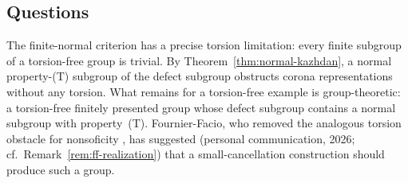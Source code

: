 \documentclass[11pt]{amsart}
\newcommand{\leanverified}[2]{\ignorespaces}
\theoremstyle{definition}
\theoremstyle{remark}
\theoremstyle{plain}
\begin{document}
\subsection*{Questions}
The finite-normal criterion has a precise torsion limitation: every finite
subgroup of a torsion-free group is trivial.
\leanverified{Sofic/TorsionFreeFiniteNormalLimit}{GroupApproximation.finiteSubgroup_eq_bot_of_isMulTorsionFree}
By Theorem~\ref{thm:normal-kazhdan}, a normal property-\textup{(T)}
subgroup of the defect subgroup obstructs corona representations
without any torsion.  What
remains for a torsion-free example is group-theoretic: a torsion-free
finitely presented group whose defect subgroup contains a normal
subgroup with property~\textup{(T)}.  Fournier-Facio, who removed the
analogous torsion obstacle for nonsoficity \cite{FFF}, has suggested
(personal communication, 2026; cf.\
Remark~\ref{rem:ff-realization}) that a small-cancellation
construction should produce such a group.
\end{document}
